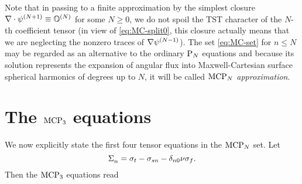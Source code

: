  Note that in passing to a finite approximation by the simplest closure \linebreak$\nabla\cdot\fmom[N+1] \equiv
\mathbb{O}^{(N)}$ for some $N \geq 0$, we do not spoil the TST character of the $N$-th coefficient tensor (in view of
\eqref{eq:MC-split0}, this closure actually means that we are neglecting the nonzero traces of $\nabla\fmom[N-1]$).
The set \eqref{eq:MC-set} for $n \leq N$ may be regarded as an alternative to the ordinary $\PN$ equations and because
its solution represents the expansion of angular flux into Maxwell-Cartesian surface spherical harmonics of degrees up
to $N$, it will be called \textit{$\MCPN$ approximation}.

\section{The $\MCPN[3]$ equations}
We now explicitly state the first four tensor equations in the
$\MCPN$ set. Let $$\Sa{n} = \sigma_t - \sigma_{sn} - \kron{n}{0}\nu\sigma_f.$$ Then the $\MCPN[3]$ equations read

